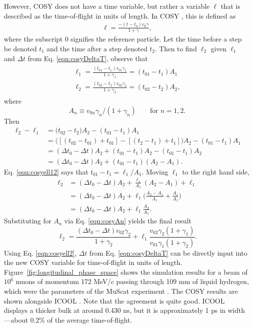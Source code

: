 However, COSY does not have a time variable, but rather a variable $\ell$ that is described as the time-of-flight in units of length. In COSY \cite{cosy}, this is defined as
\begin{align*}
\ell=\frac{-(t-t_0)v_0\gamma}{1+\gamma},
\end{align*}
where the subscript $0$ signifies the reference particle. Let the time before a step be denoted $t_1$ and the time after a step denoted $t_2$. Then to find $\ell_2$ given $\ell_1$ and $\Delta t$ from Eq. \eqref{eqn:cosyDeltaT}, observe that
\begin{align} \label{eqn:cosyell12}
\begin{split}
\ell_1=\frac{(t_{01}-t_1)v_{01}\gamma_1}{1+\gamma_1} = (t_{01}-t_1)A_1\\
\ell_2=\frac{(t_{02}-t_2)v_{02}\gamma_2}{1+\gamma_2} = (t_{02}-t_2)A_2,
\end{split}
\end{align}
where 
\begin{equation}\label{eqn:cosyAn}
A_n \equiv v_{0n}\gamma_n / (1+\gamma_n) \qquad \text{for }n=1,2.
\end{equation}
Then
\begin{align*}
\ell_2 - \ell_1 &=\big(t_{02}-t_2\big)A_2-(t_{01}-t_1)A_1\\
&=\big([(t_{02}-t_{01})+t_{01}]-[(t_2-t_1)+t_1]\big)A_2-(t_{01}-t_1)A_1\\
&=(\Delta t_0 - \Delta t )A_2 + (t_{01}-t_1)A_2-(t_{01}-t_1)A_2\\
&=(\Delta t_0 - \Delta t )A_2 + (t_{01}-t_1)(A_2-A_1).
\end{align*}
Eq. \eqref{eqn:cosyell12} says that $t_{01}-t_1=\ell_1/A_1$. Moving $\ell_1$ to the right hand side,
\begin{align*}
\ell_2 &= (\Delta t_0 - \Delta t)A_2 + \frac{\ell_1}{A_1}(A_2-A_1)+\ell_1\\
&=(\Delta t_0 - \Delta t)A_2 + \ell_1\Big(\frac{A_2-A_1}{A_1}+\frac{A_1}{A_1}\Big)\\
&=(\Delta t_0 - \Delta t)A_2 + \ell_1\frac{A_2}{A_1}.
\end{align*}
Substituting for $A_n$ via Eq. \eqref{eqn:cosyAn} yields the final result
\begin{equation}\label{eqn:cosyell2}
\ell_2=\frac{(\Delta t_0 - \Delta t) v_{02}\gamma_2}{1+\gamma_2}+\ell_1 \frac{v_{02}\gamma_2 (1+\gamma_1)}{v_{01}\gamma_1 (1+\gamma_2)}.
\end{equation}
Using Eq. \eqref{eqn:cosyell2}, $\Delta t$ from Eq. \eqref{eqn:cosyDeltaT} can be directly input into the new COSY variable for time-of-flight in units of length. Figure~\ref{fig:longitudinal_phase_space} shows the simulation results for a beam of $10^6$ muons of momentum 172 MeV/$c$ passing through 109 mm of liquid hydrogen, which were the parameters of the MuScat experiment \cite{muscat}. The COSY results are shown alongside ICOOL \cite{icool}. Note that the agreement is quite good. ICOOL displays a thicker bulk at around 0.430 ns, but it is approximately 1 ps in width---about 0.2\% of the average time-of-flight.


